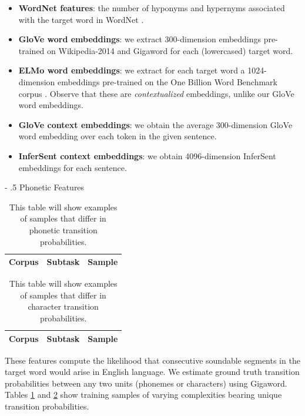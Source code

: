 \documentclass[11pt,a4paper]{article}
\makeatletter
\renewcommand\paragraph{%
    \@startsection{paragraph}{4}{0mm}%
        {-\baselineskip}%
        {.5\baselineskip}%
        {\normalfont\normalsize\bfseries}}
\makeatother
\begin{document}
\begin{itemize}
  \item \textbf{WordNet features}: the number of hyponyms and hypernyms associated with the target word in WordNet \citep{Fellbaum:2005}.
  \item \textbf{GloVe word embeddings}: we extract 300-dimension embeddings pre-trained on Wikipedia-2014 and Gigaword \citep{pennington2014glove} for each (lowercased) target word. 
  \item \textbf{ELMo word embeddings}: we extract for each target word a 1024-dimension embeddings pre-trained on the One Billion Word Benchmark corpus \citep{Peters:2018}. Observe that these are \textit{contextualized} embeddings, unlike our GloVe word embeddings. 
  \item \textbf{GloVe context embeddings}: we obtain the average 300-dimension GloVe word embedding over each token in the given sentence.
  \item \textbf{InferSent context embeddings}: we obtain 4096-dimension InferSent embeddings \citep{conneau-EtAl:2017:EMNLP2017} for each sentence.
\end{itemize}

\paragraph{Phonetic Features}

\begin{table}
  \centering
  \begin{tabular}{l|l|l}
    \toprule
    Corpus & Subtask & Sample \\
    \bottomrule
  \end{tabular}
  \caption{\label{tab:phoneme_transition_samples} This table will show examples of samples that differ in phonetic transition probabilities.}
\end{table}

\begin{table}
  \centering
  \begin{tabular}{l|l|l}
    \toprule
    Corpus & Subtask & Sample \\
    \bottomrule
  \end{tabular}
  \caption{\label{tab:char_transition_samples} This table will show examples of samples that differ in character transition probabilities.}
\end{table}

These features compute the likelihood that consecutive soundable segments in the target word would arise in English language. We estimate ground truth transition probabilities between any two units (phonemes or characters) using Gigaword. Tables \ref{tab:phoneme_transition_samples} and \ref{tab:char_transition_samples} show training samples of varying complexities bearing unique transition probabilities.
\end{document}

